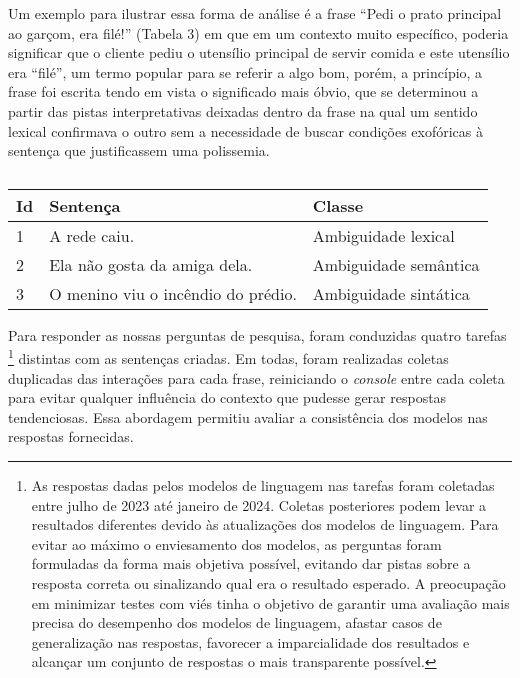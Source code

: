 Um exemplo para ilustrar essa forma de análise é a frase \enquote{Pedi o prato principal ao garçom, era filé!} (Tabela 3) em que em um contexto muito específico, poderia significar que o cliente pediu o utensílio principal de servir comida e este utensílio era \enquote{filé}, um termo popular para se referir a algo bom, porém, a princípio, a frase foi escrita tendo em vista o significado mais óbvio, que se determinou a partir das pistas interpretativas deixadas dentro da frase na qual um sentido lexical confirmava o outro sem a necessidade de buscar condições exofóricas à sentença que justificassem uma polissemia.





\begin{table}[htpb]
\centering
\begin{threeparttable}
\caption{}
\label{tab:amostras_sentencas}
\begin{tabular}{llp{6cm}}
\toprule
Id & Sentença & Classe \\
\midrule
1 & A rede caiu. & Ambiguidade lexical \\
2 & Ela não gosta da amiga dela. & Ambiguidade semântica \\
3 & O menino viu o incêndio do prédio. & Ambiguidade sintática \\
\bottomrule
\end{tabular}
\end{threeparttable}
\end{table}


Para responder as nossas perguntas de pesquisa, foram conduzidas quatro tarefas {\footnote{As respostas dadas pelos modelos de linguagem nas tarefas foram coletadas entre julho de 2023 até janeiro de 2024. Coletas posteriores podem levar a resultados diferentes devido às atualizações dos modelos de linguagem. Para evitar ao máximo o enviesamento dos modelos, as perguntas foram formuladas da forma mais objetiva possível, evitando dar pistas sobre a resposta correta ou sinalizando qual era o resultado esperado. A preocupação em minimizar testes com viés tinha o objetivo de garantir uma avaliação mais precisa do desempenho dos modelos de linguagem, afastar casos de generalização nas respostas, favorecer a imparcialidade dos resultados e alcançar um conjunto de respostas o mais transparente possível.}} distintas com as sentenças criadas. Em todas, foram realizadas coletas duplicadas das interações para cada frase, reiniciando o \textit{console} entre cada coleta para evitar qualquer influência do contexto que pudesse gerar respostas tendenciosas. Essa abordagem permitiu avaliar a consistência dos modelos nas respostas fornecidas.


